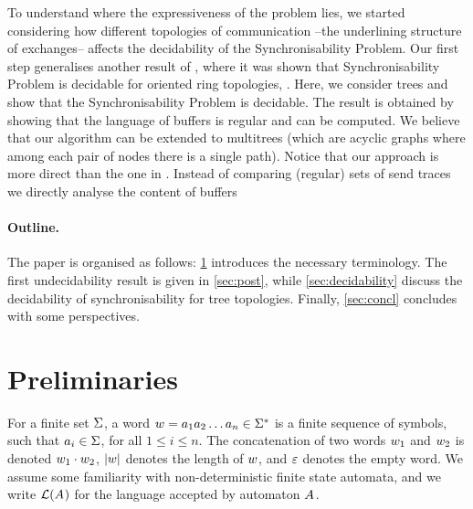 \documentclass[submission,copyright,creativecommons,UKenglish]{eptcs}
\begin{document}
To understand where the expressiveness of the problem lies, we started considering how different topologies of communication --\ie the underlining structure of exchanges-- affects the decidability of the Synchronisability Problem.
Our first step generalises another result of \cite{finkel_synchronizability_2017}, where it was shown that Synchronisability Problem is decidable for oriented ring topologies, \cite[Theorem 11]{finkel_synchronizability_2017}. Here, we consider trees and show that the Synchronisability Problem is decidable. The result is obtained by showing that the language of buffers is regular and can be computed. We believe that our algorithm can be extended to multitrees (which are acyclic graphs where among each pair of nodes there is a single path). %
Notice that our approach is more direct than the one in \cite{basu_deciding_2016}.
Instead of comparing (regular) sets of send traces we directly analyse the content of buffers
 
\paragraph{Outline.}
The paper is organised as follows: \cref{sec:prelim} introduces the necessary terminology. The first undecidability result is given in  \cref{sec:post}, while \cref{sec:decidability} discuss the decidability of synchronisability for tree topologies. 
Finally, \cref{sec:concl} concludes with some perspectives.


\section{Preliminaries}
\label{sec:prelim}

For a finite set $\Sigma$, a word $w= a_1a_2\dots a_n \in \Sigma^*$  is a finite sequence of symbols, such that $a_i \in \Sigma$,  for all $1 \leq i \leq n$. 
The concatenation of two words $w_1$ and $w_2$ is denoted $w_1\cdot w_2$, $|w|$ denotes the length of $w$,
and $\varepsilon$ denotes the empty word. We assume some familiarity with non-deterministic finite state automata,
and we write $\mathcal{L}{\left(A_{}\right)}$ for the language accepted
by  automaton $A_{}$. 
\end{document}
